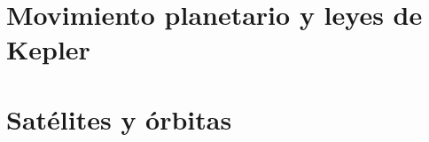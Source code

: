 ﻿\documentclass[11pt,letterpaper,openany]{book}
\newcommand{\rutaraiz}{../..}
\begin{document}

\chapter{Movimiento planetario y leyes de Kepler}





\chapter{Satélites y órbitas}





\backmatter
\end{document}
